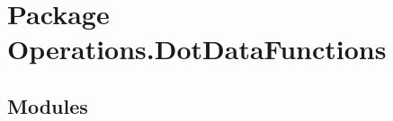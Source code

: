 %
%
%


\section{Package Operations.DotDataFunctions}

    \label{Operations:DotDataFunctions}


\subsection{Modules}

